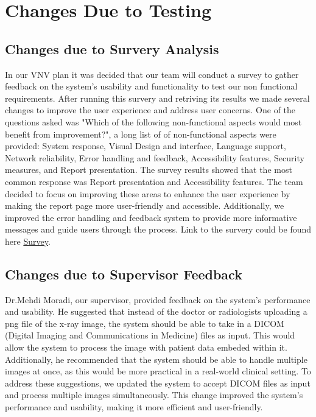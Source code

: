 \documentclass[12pt, titlepage]{article}
\begin{document}
\section{Changes Due to Testing}
\subsection{Changes due to Survery Analysis}
In our VNV plan it was decided that our team will conduct a survey to gather feedback on the system's usability and functionality to test our non functional requirements. After running this survery and retriving its results we made several changes to improve the user experience and address user concerns. One of the questions asked was "Which of the following non-functional aspects would most benefit from improvement?", a long list of of non-functional aspects were provided: System response, Visual Design and interface, Language support, Network reliability, Error handling and feedback, Accessibility features, Security measures, and Report presentation. The survey results showed that the most common response was Report presentation and Accessibility features. The team decided to focus on improving these areas to enhance the user experience by making the report page more user-friendly and accessible. Additionally, we improved the error handling and feedback system to provide more informative messages and guide users through the process. Link to the survery could be found here \href{https://docs.google.com/forms/d/e/1FAIpQLSerUF1jnbQLceYKAH8_uzAeIAO6bEwd-WwY225wNQoM95o4Xg/viewform?usp=sharing}{Survey}.
\subsection{Changes due to Supervisor Feedback}
Dr.Mehdi Moradi, our supervisor, provided feedback on the system's performance and usability. He suggested that instead of the doctor or radiologists uploading a png file of the x-ray image, the system should be able to take in a DICOM (Digital Imaging and Communications in Medicine) files as input. This would allow the system to process the image with patient data embeded within it. Additionally, he recommended that the system should be able to handle multiple images at once, as this would be more practical in a real-world clinical setting. To address these suggestions, we updated the system to accept DICOM files as input and process multiple images simultaneously. This change improved the system's performance and usability, making it more efficient and user-friendly.
\end{document}
